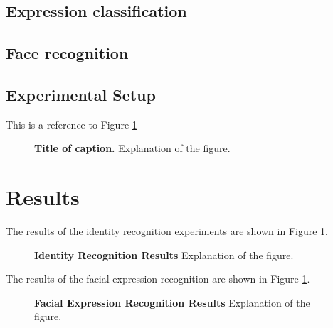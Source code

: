 \documentclass[]{article}
\begin{document}
\subsection{Expression classification}
\label{sec:expr_class}

\subsection{Face recognition}
\label{sec:face_class}


\subsection{Experimental Setup}
\label{sec:exper_setup}
This is a reference to Figure \ref{figureLabel}

\begin{figure}[ht]
\begin{center}
\vspace{-3mm}
\end{center}
\caption{\textbf{Title of caption.} Explanation of the figure.}
\label{figureLabel}
\end{figure}


\section{Results}
The results of the identity recognition experiments are shown in Figure \ref{}.


\begin{figure}[ht]
\begin{center}
\vspace{-3mm}
\end{center}
\caption{\textbf{Identity Recognition Results} Explanation of the figure.}
\label{identityRecognition}
\end{figure}


The results of the facial expression recognition  are shown in Figure \ref{}.

\begin{figure}[ht]
\begin{center}
\vspace{-3mm}
\end{center}
\caption{\textbf{Facial Expression Recognition Results} Explanation of the figure.}
\label{feRecognition}
\end{figure}
\end{document}
